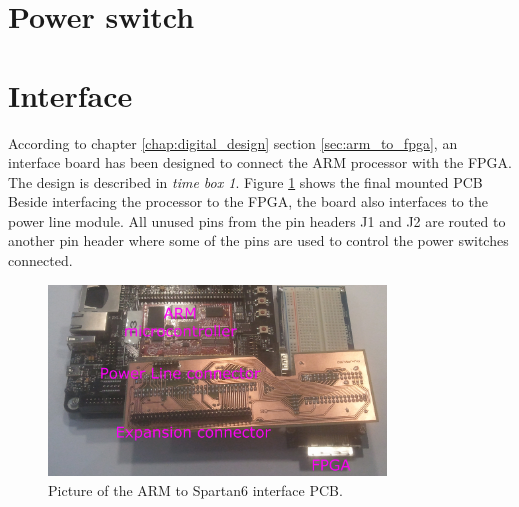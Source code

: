 \section{Power switch}
%

\section{Interface}
According to chapter \ref{chap:digital_design} section \ref{sec:arm_to_fpga}, an interface board has been designed to connect the ARM processor with the FPGA. 
The design is described in \textit{time box 1}. Figure \ref{fig:arm2fpga_interface} shows the final mounted PCB
\p Beside interfacing the processor to the FPGA, the board also interfaces to the power line module. 
\p All unused pins from the pin headers J1 and J2 are routed to another pin header where some of the pins are used to control the power switches connected.
 
\begin{figure}[H]
	\begin{centering}
		 \includegraphics[width=0.80\textwidth]{images/hw_interface_photo_v0_2.jpg}
		\caption{Picture of the ARM to Spartan6 interface PCB.}
		\label{fig:arm2fpga_interface}
	\end{centering}
\end{figure}
